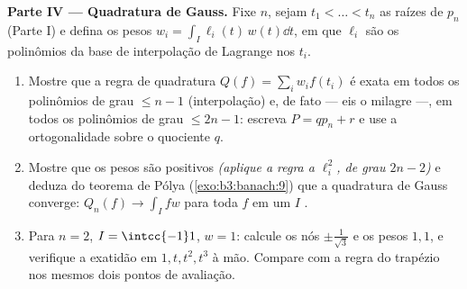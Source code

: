 \begin{problem}
\medskip
\noindent\textbf{Parte IV --- Quadratura de Gauss.} Fixe $n$, sejam
$t_1 < \dots < t_n$ as raízes de $p_n$ (Parte I) e defina os pesos $w_i = \int_I \ell_i(t)\,w(t)\dd t$, em que
$\ell_i$ são os polinômios da base de interpolação de Lagrange nos
$t_i$.
\begin{enumerate}[resume]
  \item Mostre que a regra de quadratura $Q(f) = \sum_iw_if(t_i)$ é exata em todos os
        polinômios de grau $\leq n - 1$ (interpolação) e, de fato --- eis o
        milagre ---, em todos os polinômios de grau $\leq 2n - 1$: escreva
        $P =
        qp_n + r$ e use a ortogonalidade sobre o quociente $q$.
  \item Mostre que os pesos são positivos \emph{(aplique a regra a
        $\ell_i^2$, de grau $2n -
        2$)} e deduza do teorema de Pólya
        (\cref{exo:b3:banach:9}) que a quadratura de Gauss converge: $Q_n(f) \to \int_I fw$ para
        toda $f$  em um $I$ .
  \item Para $n = 2$, $I = \intcc{-1}1$, $w = 1$: calcule os nós $\pm\frac1{\sqrt3}$ e os
        pesos $1, 1$, e verifique a exatidão em $1, t, t^2, t^3$ à mão. Compare
        com a regra do trapézio nos mesmos dois pontos de avaliação.
\end{enumerate}


\end{problem}
